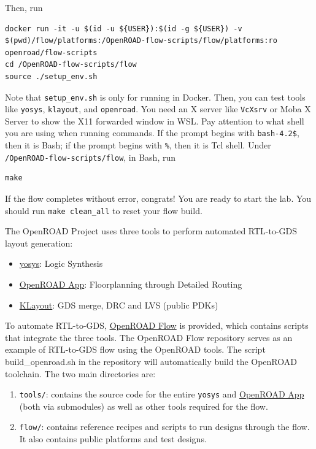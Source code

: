 \documentclass[a4paper,12pt,twoside]{article}
\begin{document}
Then, run
\begin{verbatim}
docker run -it -u $(id -u ${USER}):$(id -g ${USER}) -v $(pwd)/flow/platforms:/OpenROAD-flow-scripts/flow/platforms:ro openroad/flow-scripts
cd /OpenROAD-flow-scripts/flow
source ./setup_env.sh
\end{verbatim}
Note that \texttt{setup\_env.sh} is only for running in Docker. Then, you can test tools like \texttt{yosys}, \texttt{klayout}, and \texttt{openroad}. You need an X server like \texttt{VcXsrv} or Moba X Server to show the X11 forwarded window in WSL. Pay attention to what shell you are using when running commands. If the prompt begins with \texttt{bash-4.2\$}, then it is Bash; if the prompt begins with \texttt{\%}, then it is Tcl shell. Under \texttt{/OpenROAD-flow-scripts/flow}, in Bash, run
\begin{verbatim}
make
\end{verbatim}
If the flow completes without error, congrats! You are ready to start the lab. You should run \texttt{make clean\_all} to reset your flow build.

The OpenROAD Project uses three tools to perform automated RTL-to-GDS layout generation:
\begin{itemize}
    \item \href{https://github.com/The-OpenROAD-Project/yosys}{yosys}: Logic Synthesis
    \item \href{https://github.com/The-OpenROAD-Project/OpenROAD}{OpenROAD App}: Floorplanning through Detailed Routing
    \item \href{https://www.klayout.de/}{KLayout}: GDS merge, DRC and LVS (public PDKs)
\end{itemize}
To automate RTL-to-GDS, \href{https://github.com/The-OpenROAD-Project/OpenROAD-flow-scripts}{OpenROAD Flow} is provided, which contains scripts that integrate the three tools. The OpenROAD Flow repository serves as an example of RTL-to-GDS flow using the OpenROAD tools. The script build\_openroad.sh in the repository will automatically build the OpenROAD toolchain. The two main directories are:
\begin{enumerate}
    \item \texttt{tools/}: contains the source code for the entire \texttt{yosys} and \href{https://github.com/The-OpenROAD-Project/OpenROAD}{OpenROAD App} (both via submodules) as well as other tools required for the flow.
    \item \texttt{flow/}: contains reference recipes and scripts to run designs through the flow. It also contains public platforms and test designs.
\end{enumerate}
\end{document}
